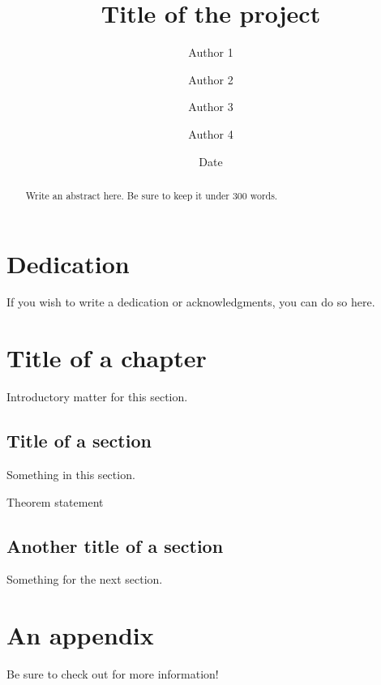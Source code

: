 \documentclass[twoside ]{memoir}
\title{Title of the project}
\author{Author 1 \and Author 2 \and Author 3 \and Author 4}
\date{Date}
\begin{document}
\frontmatter

\maketitle

\chapter{Dedication}
If you wish to write a dedication or acknowledgments, you can do so here.

\begin{abstract}
  Write an abstract here.
  Be sure to keep it under 300 words.
\end{abstract}

\tableofcontents


\mainmatter

\chapter{Title of a chapter}
Introductory matter for this section.

\section{Title of a section}
Something in this section.

\begin{theorem}
  Theorem statement
\end{theorem}

\section{Another title of a section}
Something for the next section.

\appendix
\chapter{An appendix}
Be sure to check out \cite{notsoshort} for more information!

\backmatter
\printbibliography
\end{document}
